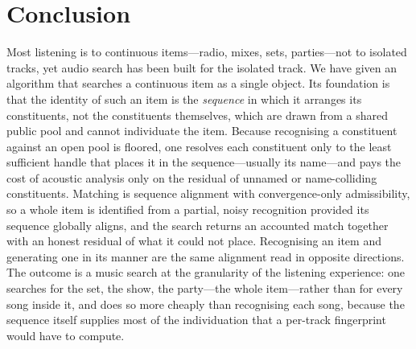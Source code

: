\documentclass[11pt,twocolumn,a4paper]{article}
\theoremstyle{thmstyle}
\theoremstyle{definition}
\theoremstyle{remark}
\begin{document}
\section{Conclusion}
\label{sec:conclusion}

Most listening is to continuous items---radio, mixes, sets, parties---not to
isolated tracks, yet audio search has been built for the isolated track. We have
given an algorithm that searches a continuous item as a single object. Its
foundation is that the identity of such an item is the \emph{sequence} in which
it arranges its constituents, not the constituents themselves, which are drawn
from a shared public pool and cannot individuate the item. Because recognising a
constituent against an open pool is floored, one resolves each constituent only
to the least sufficient handle that places it in the sequence---usually its
name---and pays the cost of acoustic analysis only on the residual of unnamed or
name-colliding constituents. Matching is sequence alignment with
convergence-only admissibility, so a whole item is identified from a partial,
noisy recognition provided its sequence globally aligns, and the search returns
an accounted match together with an honest residual of what it could not place.
Recognising an item and generating one in its manner are the same alignment read
in opposite directions. The outcome is a music search at the granularity of the
listening experience: one searches for the set, the show, the party---the whole
item---rather than for every song inside it, and does so more cheaply than
recognising each song, because the sequence itself supplies most of the
individuation that a per-track fingerprint would have to compute.



\end{document}
